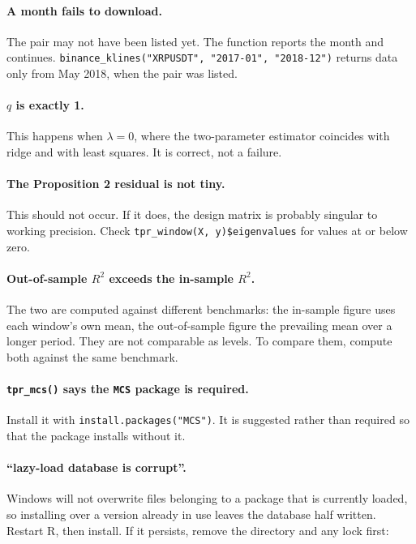 \documentclass[11pt,a4paper]{report}
\begin{document}
\paragraph{A month fails to download.}
The pair may not have been listed yet. The function reports the month and
continues. \texttt{binance\_klines("XRPUSDT", "2017-01", "2018-12")}
returns data only from May 2018, when the pair was listed.

\paragraph{$q$ is exactly 1.}
This happens when $\lambda = 0$, where the two-parameter estimator
coincides with ridge and with least squares. It is correct, not a
failure.

\paragraph{The Proposition 2 residual is not tiny.}
This should not occur. If it does, the design matrix is probably
singular to working precision. Check
\texttt{tpr\_window(X, y)\$eigenvalues} for values at or below zero.

\paragraph{Out-of-sample $R^2$ exceeds the in-sample $R^2$.}
The two are computed against different benchmarks: the in-sample figure
uses each window's own mean, the out-of-sample figure the prevailing mean
over a longer period. They are not comparable as levels. To compare them,
compute both against the same benchmark.

\paragraph{\texttt{tpr\_mcs()} says the \texttt{MCS} package is required.}
Install it with \texttt{install.packages("MCS")}. It is suggested rather
than required so that the package installs without it.

\paragraph{``lazy-load database is corrupt''.}
Windows will not overwrite files belonging to a package that is
currently loaded, so installing over a version already in use leaves the
database half written. Restart R, then install. If it persists, remove
the directory and any lock first:
\end{document}
